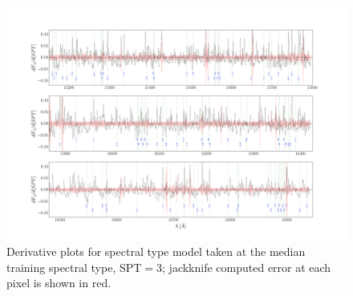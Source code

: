 \documentclass[twocolumn]{aastex62}
\begin{document}
\begin{figure}[]
	\begin{center}
	\includegraphics[width=16cm]{figures/derivative_jackknife_spt.png}
	\end{center}
	\caption{Derivative plots for spectral type model taken at the median training spectral type, SPT$=3$; jackknife computed error at each pixel is shown in red.} 
	\label{fig:west_derivative}
\end{figure}


\end{document}
